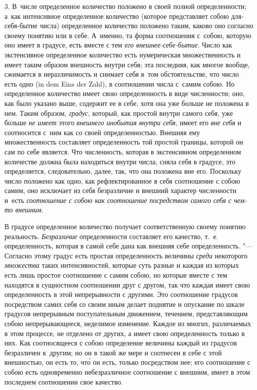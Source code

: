 3. В~числе определенное количество положено в своей полной определенности;
а~как интенсивное определенное количество (которое представляет собою
для-себя-бытие числа) определенное количество положено таким, каково оно
согласно своему понятию или в себе. А~именно, та форма соотношения с~собою,
которую оно имеет в градусе, есть вместе с тем
{\em его внешнее-себе-бытие}. Число как экстенсивное определенное количество есть нумерическая
множественность и имеет таким образом внешность внутри себя; эта последняя, как
многое вообще, сжимается в неразличимость и снимает себя в~том обстоятельстве,
что число есть одно (in dem Eins der Zahl), в соотношении числа с~самим собою.
Но определенное количество имеет свою определенность в виде численности; оно,
как было указано выше, содержит ее в себе, хотя она уже больше не положена в
нем. Таким образом, {\em градус}, который, как простой внутри самого себя, уже
больше {\em не имеет} этого {\em внешнего инобытия внутри себя}, имеет его
{\em вне себя} и соотносится с~ним как со своей определенностью. Внешняя ему
множественность составляет определенность той простой границы, которой он сам
по себе является. Что численность, которая в экстенсивном определенном
количестве должна была находиться внутри числа, сняла себя в градусе, это
определяется, следовательно, далее, так, что она положена вне его. Поскольку
число положено как одно, как рефлектированное в себя соотношение с собою самим,
оно исключает из себя безразличие и внешний характер численности и~есть
{\em соотношение с собою как соотношение посредством
самого себя с чем-то внешним}.

В градусе определенное количество получает соответственную своему понятию
реальность. {\em Безразличие} определенности составляет его качество, т.~е.
определенность, которая в самой себе дана как внешняя себе определенность. "---
Согласно этому градус есть простая определенность величины {\em среди}
некоторого {\em множества} таких интенсивностей, которые суть разные и каждая
из которых есть лишь простое соотношение с самим собою, но которые вместе с тем
находятся в сущностном соотношении друг с другом, так что каждая имеет свою
определенность в этой непрерывности с другими. Это соотношение градусов
посредством самих себя со своим иным делает поднятие и опускание по шкале
градусов непрерывным поступательным движением, течением, представляющим собою
непрерывающееся, неделимое изменение. Каждое из многих, различаемых в этом
процессе, не отделено от других, а имеет свою определенность только в них. Как
соотносящееся с собою определение величины каждый из градусов безразличен
к~другим; но он в такой же мере и соотнесен в себе с этой внешностью, он есть
то, чт\'{о} он есть, только посредством нее; его соотношение с собою есть
одновременно небезразличное соотношение с внешним, имеет в этом последнем
соотношении свое качество.

